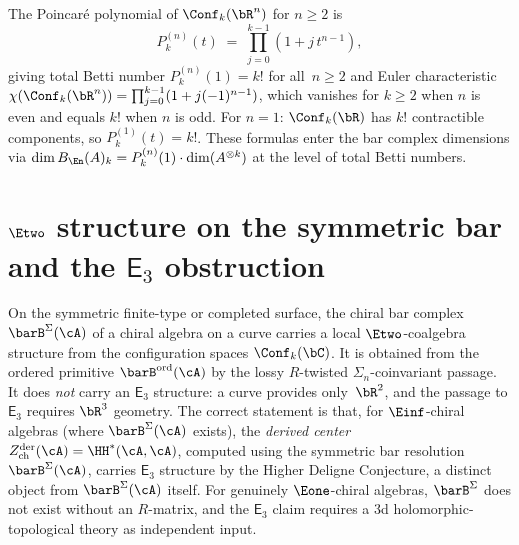 \begin{remark}
\label{rem:en-poincare-polynomials}
The Poincar\'e polynomial of $\Conf_k(\bR^n)$ for $n \geq 2$ is
\[
P_k^{(n)}(t)
\;=\;
\prod_{j=0}^{k-1} (1 + j\, t^{n-1}),
\]
giving total Betti number $P_k^{(n)}(1) = k!$ for all~$n \geq 2$
and Euler characteristic
$\chi(\Conf_k(\bR^n)) = \prod_{j=0}^{k-1}(1 + j(-1)^{n-1})$,
which vanishes for $k \geq 2$ when $n$ is even and equals $k!$
when $n$ is odd.
For $n = 1$: $\Conf_k(\bR)$ has $k!$ contractible components,
so $P_k^{(1)}(t) = k!$.
These formulas enter the bar complex dimensions via
$\dim B_{\En}(A)_k = P_k^{(n)}(1) \cdot \dim(A^{\otimes k})$
at the level of total Betti numbers.
\end{remark}



\section{\texorpdfstring{$\Etwo$ structure on the symmetric bar and the $\mathsf{E}_3$ obstruction}{E2 structure on the symmetric bar and the E3 obstruction}}
\label{sec:e3-bar-structure}

On the symmetric finite-type or completed surface, the chiral bar complex
$\barB^{\Sigma}(\cA)$ of a chiral algebra on a curve carries a local
$\Etwo$-coalgebra structure from the configuration spaces
$\Conf_k(\bC)$. It is obtained from the
ordered primitive $\barB^{\mathrm{ord}}(\cA)$ by the lossy
$R$-twisted $\Sigma_n$-coinvariant passage. It does \emph{not}
carry an $\mathsf{E}_3$ structure: a curve provides only~$\bR^2$,
and the passage to $\mathsf{E}_3$ requires $\bR^3$ geometry. The
correct statement is that, for $\Einf$-chiral algebras
(where $\barB^{\Sigma}(\cA)$ exists), the \emph{derived center}
$Z^{\mathrm{der}}_{\mathrm{ch}}(\cA)
= \HH^*(\cA, \cA)$, computed using the symmetric bar resolution
$\barB^{\Sigma}(\cA)$, carries $\mathsf{E}_3$ structure by the Higher
Deligne Conjecture,
a distinct object from $\barB^{\Sigma}(\cA)$ itself.
For genuinely $\Eone$-chiral algebras, $\barB^{\Sigma}$ does not
exist without an $R$-matrix, and the $\mathsf{E}_3$ claim requires
a 3d holomorphic-topological theory as independent input.

